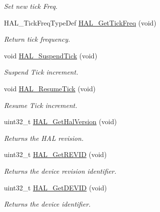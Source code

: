 \begin{DoxyCompactItemize}
\begin{DoxyCompactList}\small\item\em Set new tick Freq. \end{DoxyCompactList}\item 
H\+A\+L\+\_\+\+Tick\+Freq\+Type\+Def \hyperlink{group___h_a_l___exported___functions___group2_ga803cdbcc0883bcf5f5c98c50024c97e6}{H\+A\+L\+\_\+\+Get\+Tick\+Freq} (void)
\begin{DoxyCompactList}\small\item\em Return tick frequency. \end{DoxyCompactList}\item 
void \hyperlink{group___h_a_l___exported___functions___group2_ga84ae4b045c45d49d96b2b02e2dc516b6}{H\+A\+L\+\_\+\+Suspend\+Tick} (void)
\begin{DoxyCompactList}\small\item\em Suspend Tick increment. \end{DoxyCompactList}\item 
void \hyperlink{group___h_a_l___exported___functions___group2_gac3fa17aa85e357e3f1af56ad110d2e97}{H\+A\+L\+\_\+\+Resume\+Tick} (void)
\begin{DoxyCompactList}\small\item\em Resume Tick increment. \end{DoxyCompactList}\item 
uint32\+\_\+t \hyperlink{group___h_a_l___exported___functions___group2_gafb139b375512ad2a234e4619b129b966}{H\+A\+L\+\_\+\+Get\+Hal\+Version} (void)
\begin{DoxyCompactList}\small\item\em Returns the H\+AL revision. \end{DoxyCompactList}\item 
uint32\+\_\+t \hyperlink{group___h_a_l___exported___functions___group2_gae051ef9e932404b21f5877c7186406b8}{H\+A\+L\+\_\+\+Get\+R\+E\+V\+ID} (void)
\begin{DoxyCompactList}\small\item\em Returns the device revision identifier. \end{DoxyCompactList}\item 
uint32\+\_\+t \hyperlink{group___h_a_l___exported___functions___group2_gaff785f069ed650de77ff82ac407f7c84}{H\+A\+L\+\_\+\+Get\+D\+E\+V\+ID} (void)
\begin{DoxyCompactList}\small\item\em Returns the device identifier. \end{DoxyCompactList}\item 

\end{DoxyCompactItemize}
